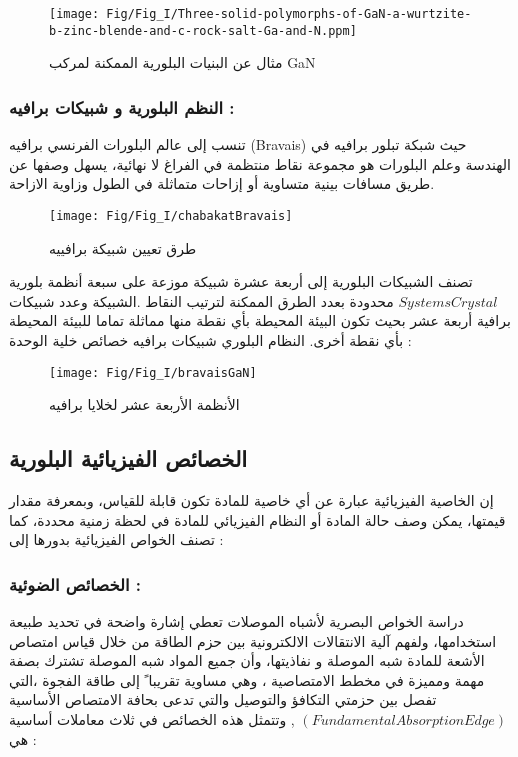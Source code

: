\begin{figure}[bh]
	\centering
	\texttt{[image: Fig/Fig\_I/Three-solid-polymorphs-of-GaN-a-wurtzite-b-zinc-blende-and-c-rock-salt-Ga-and-N.ppm]}
	\caption{مثال عن البنيات البلورية الممكنة لمركب GaN }
	\label{fig:three-solid-polymorphs-of-gan-a-wurtzite-b-zinc-blende-and-c-rock-salt-ga-and-n}
\end{figure}
\FloatBarrier

\subsubsection{النظم البلورية و شبيكات برافيه :}
تنسب إلى عالم البلورات الفرنسي برافيه (Bravais) حيث شبكة تبلور برافيه في الهندسة وعلم البلورات هو مجموعة نقاط منتظمة في الفراغ لا نهائية، يسهل وصفها عن طريق مسافات بينية متساوية أو إزاحات متماثلة في الطول وزاوية الازاحة. 

\begin{figure}[bh]
	\centering
	\texttt{[image: Fig/Fig\_I/chabakatBravais]}
	\caption{طرق تعيين شبيكة برافييه}
	\label{fig:chabakatbravais}
\end{figure}
\FloatBarrier

تصنف الشبيكات البلورية إلى أربعة عشرة شبيكة موزعة على سبعة أنظمة بلورية $ Systems Crystal $ محدودة بعدد الطرق الممكنة لترتيب النقاط .الشبيكة وعدد شبيكات برافية أربعة عشر بحيث تكون البيئة المحيطة بأي نقطة منها مماثلة تماما للبيئة المحيطة بأي نقطة أخرى.
النظام البلوري شبيكات برافيه خصائص خلية الوحدة : \cite{a1}

\begin{figure}[th]
	\centering
	\texttt{[image: Fig/Fig\_I/bravaisGaN]}
	\caption{الأنظمة الأربعة عشر لخلايا برافيه }
	\label{fig:bravaisgan}
\end{figure}
\FloatBarrier

\subsection{الخصائص الفيزيائية البلورية }
إن الخاصية الفيزيائية عبارة عن أي خاصية للمادة تكون قابلة للقياس، وبمعرفة مقدار قيمتها، يمكن وصف حالة المادة أو النظام الفيزيائي للمادة في لحظة زمنية محددة، كما تصنف الخواص الفيزيائية بدورها إلى : 

\subsubsection{الخصائص الضوئية :  }
	دراسة الخواص البصرية لأشباه الموصلات تعطي إشارة واضحة في تحديد طبيعة استخدامها، ولفهم آلية الانتقالات الالكترونية بين حزم الطاقة من خلال قياس امتصاص الأشعة للمادة شبه الموصلة و نفاذيتها، وأن جميع المواد شبه الموصلة تشترك بصفة مهمة ومميزة في مخطط الامتصاصية ، وهي مساوية تقريبا ً إلى طاقة الفجوة ،التي تفصل بين حزمتي التكافؤ والتوصيل والتي تدعى بحافة الامتصاص الأساسية $ ( Fundamental Absorption Edge )  $ , وتتمثل هذه الخصائص في ثلاث معاملات أساسية هي : 
